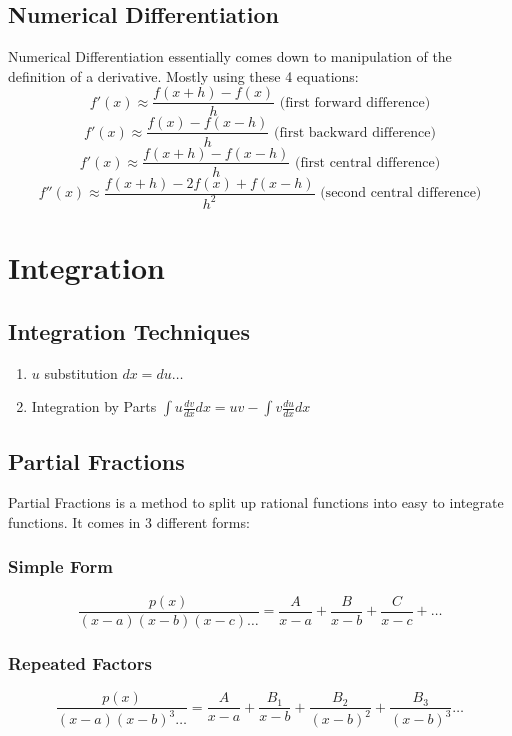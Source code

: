 \documentclass[12pt] {article}
\begin{document}
\subsection*{Numerical Differentiation}
Numerical Differentiation essentially comes down to manipulation of the definition of a derivative. Mostly using these 4 equations:
\begin{equation*}
  f'(x) \approx \frac{f(x+h)-f(x)}{h} \text{ (first forward difference)}
\end{equation*}
\begin{equation*}
  f'(x) \approx \frac{f(x)-f(x-h)}{h} \text{ (first backward difference)}
\end{equation*}
\begin{equation*}
  f'(x) \approx \frac{f(x+h)-f(x-h)}{h} \text{ (first central difference)}
\end{equation*}
\begin{equation*}
  f''(x) \approx \frac{f(x+h)-2f(x)+f(x-h)}{h^2} \text{ (second central difference)}
\end{equation*}
\section{Integration}
\subsection*{Integration Techniques}
\begin{enumerate}
  \item $u$ substitution $dx=du\dotsc$
  \item Integration by Parts $\int u \frac{dv}{dx} dx = uv - \int v \frac{du}{dx}dx$
\end{enumerate}
\subsection*{Partial Fractions}
Partial Fractions is a method to split up rational functions into easy to integrate functions. 
It comes in 3 different forms:
\subsubsection*{Simple Form}
\begin{equation*}
\frac{p(x)}{(x-a)(x-b)(x-c)\dotsc} = \frac{A}{x-a} + \frac{B}{x-b} + \frac{C}{x-c} + \dotsc
\end{equation*}
\subsubsection*{Repeated Factors}
\begin{equation*}
  \frac{p(x)}{(x-a)(x-b)^3\dotsc} = \frac{A}{x-a} + \frac{B_1}{x-b} + \frac{B_2}{(x-b)^2} + \frac{B_3}{(x-b)^3} \dotsc
\end{equation*}
\end{document}
